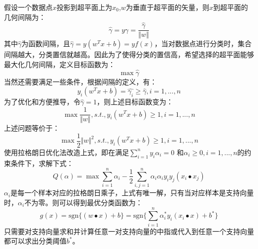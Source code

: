 假设一个数据点$x$投影到超平面上为$x_{0}$,$w$为垂直于超平面的矢量，则$x$到超平面的几何间隔为：
\begin{equation}
\hat{\gamma}=y\gamma=\frac{\hat{\gamma}}{\Vert{w}\Vert}
\end{equation}
其中$\hat{\gamma}$为函数间隔，且$\hat{\gamma}=y(w^{T}x+b)=yf(x)$，当对数据点进行分类时，集合间隔越大，分类置信就越高。因此为了使得分类的置信高，希望选择的超平面能够最大化几何间隔，定义目标函数为：
\begin{equation}
\max \hat{\gamma}
\end{equation}
当然还需要满足一些条件，根据间隔的定义，有：
\begin{equation}
y_{i}(w^{T}x+b)=\hat{\gamma_{i}}\ge\hat{\gamma},i=1,...,n
\end{equation}
为了优化和方便推导，令$\hat{\gamma}=1$，则上述目标函数变为：
\begin{equation}
\max\frac{1}{\Vert{w}\Vert},s.t.,y_{i}(w^{T}x+b)\ge1,i=1,...,n
\end{equation}
上述问题等价于：
\begin{equation}
\max\frac{1}{2}\Vert{w}\Vert^{2},s.t.,y_{i}(w^{T}x+b)\ge1,i=1,...,n
\end{equation}
使用拉格朗日优化法改造上式，即在满足$\sum_{i=1}^{n}y_{i}\alpha_{i}=0$
和$\alpha_{i}\ge0,i=1,...,n$的约束条件下，求解下式：
\begin{equation}
Q(\alpha)=\max \sum_{i=1}^{n}\alpha_{i}-\frac{1}{2}\sum_{i,j=1}^{n}\alpha_{i}\alpha_{i}y_{i}y_{j}(x_{i}\bullet x_{j})
\end{equation}
$\alpha_{i}$是每一个样本对应的拉格朗日乘子，上式有唯一解，只有当对应样本是支持向量时，$\alpha_{i}$不为零。则可以得到最优分类函数为：
\begin{equation}
g(x)=\textrm{sgn}\{(w\bullet x)+b\}=\textrm{sgn}\Big \{\sum_{i=1}^{n}\alpha_{i}^{*}y_{i}(x_{i}\bullet x)+b^{*}\Big \}
\end{equation}
只需要对支持向量求和并计算任意一对支持向量的中指或代入到任意一个支持向量都可以求出分类阈值$b^{*}$。


